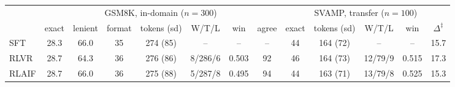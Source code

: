 \begin{tabular}{@{}lccccccc|ccccc@{}}
\toprule
 & \multicolumn{7}{c|}{GSM8K, in-domain ($n=300$)} & \multicolumn{5}{c}{SVAMP, transfer ($n=100$)} \\
 & exact & lenient & format & tokens (sd) & W/T/L & win & agree & exact & tokens (sd) & W/T/L & win & $\Delta^\ddagger$ \\
\midrule
SFT & 28.3 & 66.0 & 35 & 274 (85) & -- & -- & -- & 44 & 164 (72) & -- & -- & 15.7 \\
RLVR & 28.7 & 64.3 & 36 & 276 (86) & 8/286/6 & 0.503 & 92 & 46 & 164 (73) & 12/79/9 & 0.515 & 17.3 \\
RLAIF & 28.7 & 66.0 & 36 & 275 (88) & 5/287/8 & 0.495 & 94 & 44 & 163 (71) & 13/79/8 & 0.525 & 15.3 \\
\bottomrule
\end{tabular}
